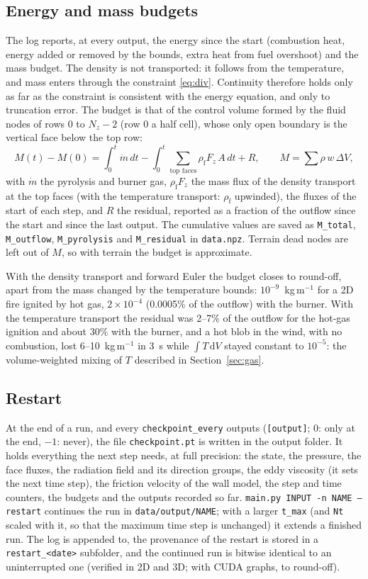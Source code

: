 \documentclass[11pt,a4paper]{article}
\newcommand{\dd}{\,\mathrm{d}}
\newcommand{\code}[1]{\texttt{#1}}
\begin{document}
\subsection{Energy and mass budgets}\label{sec:mass-budget}
The log reports, at every output, the energy since the start (combustion heat, energy added or
removed by the bounds, extra heat from fuel overshoot) and the mass budget. The density is not
transported: it follows from the temperature, and mass enters through the constraint \eqref{eq:div}.
Continuity therefore holds only as far as the constraint is consistent with the energy equation, and
only to truncation error. The budget is that of the control volume formed by the fluid nodes of rows
$0$ to $N_z-2$ (row 0 a half cell), whose only open boundary is the vertical face below the top row:
\[
  M(t)-M(0) = \int_0^t \dot m\,dt - \int_0^t \sum_{\text{top faces}} \rho_\text{f} F_z\,A\,dt + R,
  \qquad M=\sum \rho\, w\, \Delta V,
\]
with $\dot m$ the pyrolysis and burner gas, $\rho_\text{f} F_z$ the mass flux of the density transport at the
top faces (with the temperature transport: $\rho_\text{f}$ upwinded), the fluxes of the start of each step,
and $R$ the residual, reported as a fraction of the outflow
since the start and since the last output. The cumulative values are saved as \code{M\_total},
\code{M\_outflow}, \code{M\_pyrolysis} and \code{M\_residual} in \code{data.npz}. Terrain dead nodes are
left out of $M$, so with terrain the budget is approximate.

With the density transport and forward Euler the budget closes to round-off, apart from the mass
changed by the temperature bounds: $10^{-9}$~kg\,m$^{-1}$ for a 2D fire ignited by hot gas, $2\times10^{-4}$
(0.0005\% of the outflow) with the burner. With the temperature transport the residual was 2--7\% of
the outflow for the hot-gas ignition and about 30\% with the burner, and a hot blob in the wind, with
no combustion, lost 6--10~kg\,m$^{-1}$ in 3~s while $\int T\dd V$ stayed constant to $10^{-5}$: the
volume-weighted mixing of $T$ described in Section~\ref{sec:gas}.

\subsection{Restart}
At the end of a run, and every \code{checkpoint\_every} outputs (\code{[output]}; 0: only at the end, $-1$:
never), the file \code{checkpoint.pt} is written in the output folder. It holds everything the next step needs, at full
precision: the state, the pressure, the face fluxes, the radiation field and its direction groups, the eddy
viscosity (it sets the next time step), the friction velocity of the wall model, the step and time counters,
the budgets and the outputs recorded so far. \code{main.py INPUT -n NAME --restart} continues the run in
\code{data/output/NAME}; with a larger \code{t\_max} (and \code{Nt} scaled with it, so that the maximum time
step is unchanged) it extends a finished run. The log is appended to, the provenance of the restart is stored
in a \code{restart\_<date>} subfolder, and the continued run is bitwise identical to an uninterrupted one
(verified in 2D and 3D; with CUDA graphs, to round-off).
\end{document}
